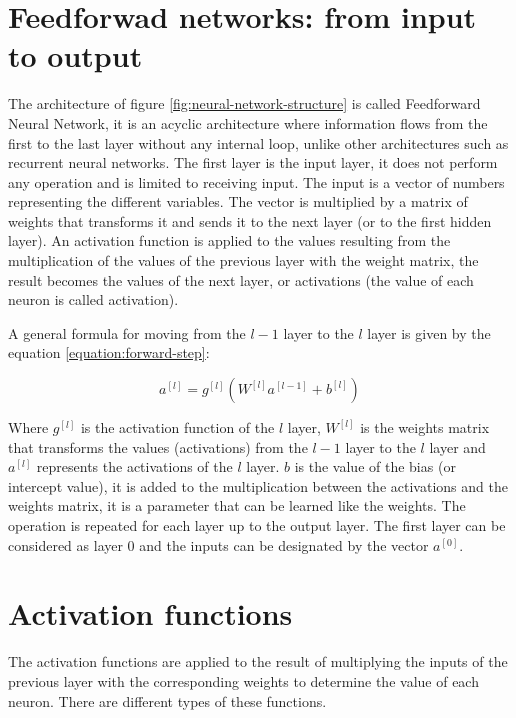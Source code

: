 \section{Feedforwad networks: from input to output}
\label{section:feedforward-neural-network}
The architecture of figure \ref{fig:neural-network-structure} is called Feedforward Neural Network, it is an acyclic architecture where information flows from the first to the last layer without any internal loop, unlike other architectures such as recurrent neural networks. The first layer is the input layer, it does not perform any operation and is limited to receiving input. The input is a vector of numbers representing the different variables. The vector is multiplied by a matrix of weights that transforms it and sends it to the next layer (or to the first hidden layer). An activation function is applied to the values resulting from the multiplication of the values of the previous layer with the weight matrix, the result becomes the values of the next layer, or activations (the value of each neuron is called activation).

A general formula for moving from the $l-1$ layer to the $l$ layer is given by the equation \ref{equation:forward-step}:

\begin{equation}
    a^{[l]} = g^{[l]}(W^{[l]}a^{[l-1]}+b^{[l]})
    \label{equation:forward-step}
\end{equation}

Where $g^{[l]}$ is the activation function of the $l$ layer, $W^{[l]}$ is the weights matrix that transforms the values (activations) from the $l-1$ layer to the $l$ layer and $a^{[l]}$ represents the activations of the $l$ layer. $b$ is the value of the bias (or intercept value), it is added to the multiplication between the activations and the weights matrix, it is a parameter that can be learned like the weights. The operation is repeated for each layer up to the output layer.
The first layer can be considered as layer 0 and the inputs can be designated by the vector $a^{[0]}$.

\section{Activation functions}
The activation functions are applied to the result of multiplying the inputs of the previous layer with the corresponding weights to determine the value of each neuron. There are different types of these functions.

